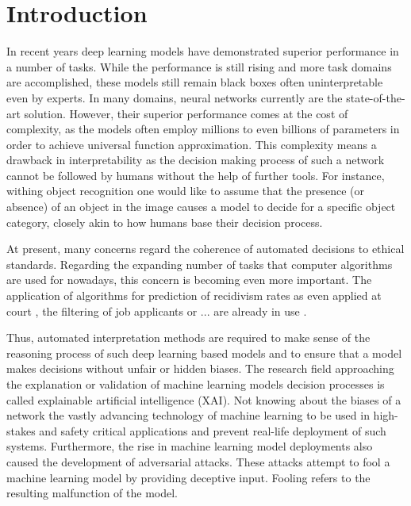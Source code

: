 \section{Introduction}
\label{sec:introduction}

In recent years deep learning models have demonstrated superior performance in a number of tasks. While the performance is still rising and more task domains are accomplished, these models still remain black boxes often uninterpretable even by experts. 
In many domains, neural networks currently are the state-of-the-art solution. However, their superior performance comes at the cost of complexity, as the models often employ millions to even billions of parameters in order to achieve universal function approximation. This complexity means a drawback in interpretability as the decision making process of such a network cannot be followed by humans without the help of further tools. For instance, withing object recognition one would like to assume that the presence (or absence) of an object in the image causes a model to decide for a specific object category, closely akin to how humans base their decision process. 

At present, many concerns regard the coherence of automated decisions to ethical standards. Regarding the expanding number of tasks that computer algorithms are used for nowadays, this concern is becoming even more important. The application of algorithms for prediction of recidivism rates as even applied at court \cite{chouldechova2017fair}, the filtering of job applicants or ... are already in use \cite{lipton2018mythos}. 






Thus, automated interpretation methods are required to make sense of the reasoning process of such deep learning based models and to ensure that a model makes decisions without unfair or hidden biases. 
The research field approaching the explanation or validation of machine learning models decision processes is called explainable artificial intelligence (XAI).
Not knowing about the biases of a network the vastly advancing technology of machine learning to be used in high-stakes and safety critical applications and prevent real-life deployment of such systems. 
Furthermore, the rise in machine learning model deployments also caused the development of adversarial attacks. These attacks attempt to fool a machine learning model by providing deceptive input. Fooling refers to the resulting malfunction of the model. 

